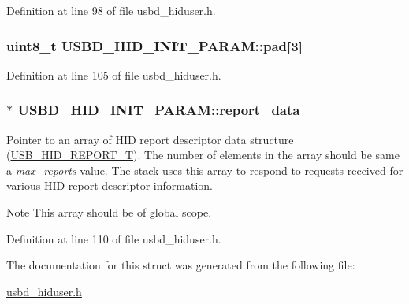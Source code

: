 Definition at line 98 of file usbd\+\_\+hiduser.\+h.

\subsubsection[{\texorpdfstring{pad}{pad}}]{\setlength{\rightskip}{0pt plus 5cm}uint8\+\_\+t U\+S\+B\+D\+\_\+\+H\+I\+D\+\_\+\+I\+N\+I\+T\+\_\+\+P\+A\+R\+A\+M\+::pad\mbox{[}3\mbox{]}}\hypertarget{structUSBD__HID__INIT__PARAM_abe66157322df2a9f655708b8ae2795e9}{}\label{structUSBD__HID__INIT__PARAM_abe66157322df2a9f655708b8ae2795e9}


Definition at line 105 of file usbd\+\_\+hiduser.\+h.

\subsubsection[{\texorpdfstring{report\+\_\+data}{report_data}}]{$\ast$ U\+S\+B\+D\+\_\+\+H\+I\+D\+\_\+\+I\+N\+I\+T\+\_\+\+P\+A\+R\+A\+M\+::report\+\_\+data}\hypertarget{structUSBD__HID__INIT__PARAM_a2e46476d82b7859a239feeadf457d0e8}{}\label{structUSBD__HID__INIT__PARAM_a2e46476d82b7859a239feeadf457d0e8}
Pointer to an array of H\+ID report descriptor data structure (\hyperlink{group__USBD__HID_gaaa1686adb431783ea4357e6899c0d39d}{U\+S\+B\+\_\+\+H\+I\+D\+\_\+\+R\+E\+P\+O\+R\+T\+\_\+T}). The number of elements in the array should be same a {\itshape max\+\_\+reports} value. The stack uses this array to respond to requests received for various H\+ID report descriptor information. \begin{DoxyNote}{Note}
This array should be of global scope. 
\end{DoxyNote}


Definition at line 110 of file usbd\+\_\+hiduser.\+h.



The documentation for this struct was generated from the following file\+:\begin{DoxyCompactItemize}
\item 
\hyperlink{usbd__hiduser_8h}{usbd\+\_\+hiduser.\+h}\end{DoxyCompactItemize}
